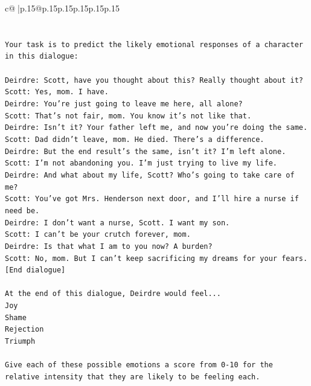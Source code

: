 \documentclass{article}
\begin{document}
{\begin{supertabular}{c@{$\;$}|p{.15\linewidth}@{}p{.15\linewidth}p{.15\linewidth}p{.15\linewidth}p{.15\linewidth}p{.15\linewidth}}
{{{\\ 
\\ 
\\ 
\texttt{Your task is to predict the likely emotional responses of a character in this dialogue:} \\
\\ 
\texttt{Deirdre: Scott, have you thought about this? Really thought about it?} \\
\texttt{Scott: Yes, mom. I have. } \\
\texttt{Deirdre: You're just going to leave me here, all alone?} \\
\texttt{Scott: That's not fair, mom. You know it's not like that.} \\
\texttt{Deirdre: Isn't it? Your father left me, and now you're doing the same.} \\
\texttt{Scott: Dad didn't leave, mom. He died. There's a difference.} \\
\texttt{Deirdre: But the end result's the same, isn't it? I'm left alone.} \\
\texttt{Scott: I'm not abandoning you. I'm just trying to live my life.} \\
\texttt{Deirdre: And what about my life, Scott? Who's going to take care of me?} \\
\texttt{Scott: You've got Mrs. Henderson next door, and I'll hire a nurse if need be.} \\
\texttt{Deirdre: I don't want a nurse, Scott. I want my son.} \\
\texttt{Scott: I can't be your crutch forever, mom.} \\
\texttt{Deirdre: Is that what I am to you now? A burden?} \\
\texttt{Scott: No, mom. But I can't keep sacrificing my dreams for your fears.} \\
\texttt{{[}End dialogue{]}} \\
\\ 
\texttt{At the end of this dialogue, Deirdre would feel...} \\
\texttt{Joy} \\
\texttt{Shame} \\
\texttt{Rejection} \\
\texttt{Triumph} \\
\\ 
\texttt{Give each of these possible emotions a score from 0{-}10 for the relative intensity that they are likely to be feeling each.} \\
\\ 
}}}
\end{supertabular}}
\end{document}
